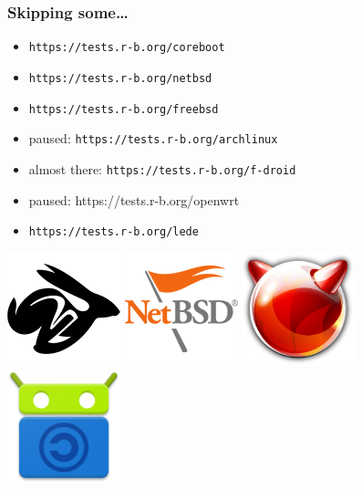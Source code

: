 \documentclass[14pt,aspectratio=169]{beamer}
\newif\ifplacelogo
\begin{document}
\placelogofalse

\begin{frame}
 \frametitle{Skipping some…}
 \begin{itemize}
  \item \texttt{https://tests.r-b.org/coreboot}
  \item \texttt{https://tests.r-b.org/netbsd}
  \item \texttt{https://tests.r-b.org/freebsd}
  \item paused: \texttt{https://tests.r-b.org/archlinux}
  \item almost there: \texttt{https://tests.r-b.org/f-droid}
  \item paused: {https://tests.r-b.org/openwrt}
  \item \texttt{https://tests.r-b.org/lede}
 \end{itemize}
 \begin{center}
  \includegraphics[height=0.13\paperheight]{images/coreboot.png}
  \hspace{0.05\paperwidth}
  \includegraphics[height=0.13\paperheight]{images/netbsd.png}
  \hspace{0.05\paperwidth}
  \includegraphics[height=0.13\paperheight]{images/freebsd.png}
  \hspace{0.05\paperwidth}
  \includegraphics[height=0.13\paperheight]{images/f-droid.png}

\end{center}
\end{frame}
\end{document}
